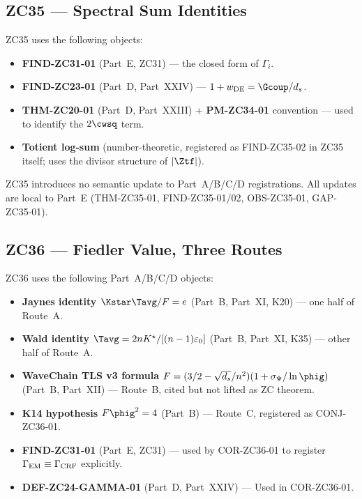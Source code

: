\documentclass[12pt, a4paper]{article}
\begin{document}
\subsection{ZC35 --- Spectral Sum Identities}
\label{cmap:zc35}

\begin{inheritbox}
ZC35 uses the following objects:
\begin{itemize}[noitemsep,leftmargin=1.5em]
  \item \textbf{FIND-ZC31-01} (Part~E, ZC31) --- the closed form of
    $\Gamma_i$.
  \item \textbf{FIND-ZC23-01} (Part~D, Part~XXIV) ---
    $1 + w_{\rm DE} = \Gcoup/d_s$.
  \item \textbf{THM-ZC20-01} (Part~D, Part~XXIII) + \textbf{PM-ZC34-01}
    convention --- used to identify the $2\cwsq$ term.
  \item \textbf{Totient log-sum} (number-theoretic, registered as
    FIND-ZC35-02 in ZC35 itself; uses the divisor structure of $|\Ztf|$).
\end{itemize}
\end{inheritbox}

\begin{correctionbox}
ZC35 introduces no semantic update to Part~A/B/C/D registrations.
All updates are local to Part~E (THM-ZC35-01, FIND-ZC35-01/02,
OBS-ZC35-01, GAP-ZC35-01).
\end{correctionbox}

\bigskip

\subsection{ZC36 --- Fiedler Value, Three Routes}
\label{cmap:zc36}

\begin{inheritbox}
ZC36 uses the following Part~A/B/C/D objects:
\begin{itemize}[noitemsep,leftmargin=1.5em]
  \item \textbf{Jaynes identity $\Kstar\Tavg/F = e$} (Part~B, Part~XI,
    K20) --- one half of Route~A.
  \item \textbf{Wald identity $\Tavg = 2nK^\star/[(n-1)\varepsilon_0]$}
    (Part~B, Part~XI, K35) --- other half of Route~A.
  \item \textbf{WaveChain TLS v3 formula}
    $F = (3/2 - \sqrt{d_s}/n^2)(1 + \sigma_\Psi/\ln\phig)$
    (Part~B, Part~XII) --- Route~B, cited but not lifted as ZC theorem.
  \item \textbf{K14 hypothesis $F\phig^2 = 4$} (Part~B) ---
    Route~C, registered as CONJ-ZC36-01.
  \item \textbf{FIND-ZC31-01} (Part~E, ZC31) ---
    used by COR-ZC36-01 to register $\Gamma_{\rm EM} \equiv
    \Gamma_{\rm CRF}$ explicitly.
  \item \textbf{DEF-ZC24-GAMMA-01} (Part~D, Part~XXIV) ---
    Used in COR-ZC36-01.
\end{itemize}
\end{inheritbox}
\end{document}
